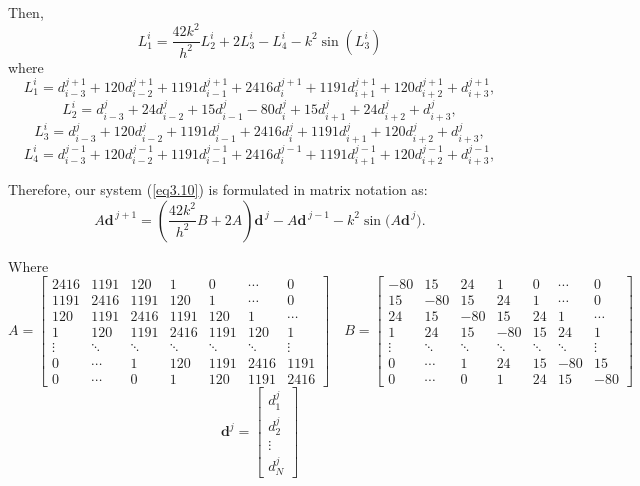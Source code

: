 \documentclass[10pt,letterpaper,twoside]{article}
\begin{document}
\noindent Then,
\begin{equation}\label{eq3.10}
  L_{1}^{i}= \frac{42k^2}{h^2}L_{2}^{i}+2L_{3}^{i}-L_{4}^{i}-k^{2}\sin(L_{3}^{i})
\end{equation}
where 
$$L_{1}^{i}=d_{i-3}^{j+1}+120d_{i-2}^{j+1} + 1191d_{i-1}^{j+1} + 2416d_i^{j+1} + 1191d_{i+1}^{j+1} + 120d_{i+2}^{j+1}+d_{i+3}^{j+1},$$ 
$$L_{2}^{i}= d_{i-3}^{j}+ 24d_{i-2}^{j} + 15d_{i-1}^{j} - 80d_{i}^{j} + 15d_{i+1}^{j} +24 d_{i+2}^{j}+d_{i+3}^{j},$$  
$$L_{3}^{i}=d_{i-3}^{j}+120d_{i-2}^{j} + 1191d_{i-1}^{j} + 2416d_i^{j} + 1191d_{i+1}^{j} + 120d_{i+2}^{j}+d_{i+3}^{j},$$
$$L_{4}^{i}=d_{i-3}^{j-1}+ 120d_{i-2}^{j-1} + 1191d_{i-1}^{j-1}+ 2416d_{i}^{j-1} + 1191d_{i+1}^{j-1} +120 d_{i+2}^{j-1}+d_{i+3}^{j-1},$$

Therefore, our system (\ref{eq3.10}) is formulated in matrix notation as:
\begin{equation}
  A \bm{d}^{\,j+1}
  =
  \left( \frac{42k^2}{h^2} B + 2A \right)\bm{d}^{\,j}
  - A\bm{d}^{\,j-1}
  - k^2 \sin\!\big(A \bm{d}^{\,j}\big).
\end{equation}

Where
\[
 A =
 \begin{bmatrix}
  2416 & 1191 & 120 & 1 & 0 & \cdots & 0\\
  1191 & 2416 & 1191 & 120 & 1 & \cdots & 0\\
  120 & 1191 & 2416 & 1191 & 120 & 1 & \cdots\\
  1 & 120 & 1191 & 2416 & 1191 & 120 & 1\\
  \vdots & \ddots & \ddots & \ddots & \ddots & \ddots & \vdots\\
  0 & \cdots & 1 & 120 & 1191 & 2416 & 1191\\
  0 & \cdots & 0 & 1 & 120 & 1191 & 2416
 \end{bmatrix}
 \quad
 B =
 \begin{bmatrix}
  -80 & 15 & 24 & 1 & 0 & \cdots & 0\\
  15 & -80 & 15 & 24 & 1 & \cdots & 0\\
  24 & 15 & -80 & 15 & 24 & 1 & \cdots\\
  1 & 24 & 15 & -80 & 15 & 24 & 1\\
  \vdots & \ddots & \ddots & \ddots & \ddots & \ddots & \vdots\\
  0 & \cdots & 1 & 24 & 15 & -80 & 15\\
  0 & \cdots & 0 & 1 & 24 & 15 & -80
 \end{bmatrix}
\]
\[
 \bm{d}^{j} =
 \begin{bmatrix}
  d^{j}_1 \\[3pt]
  d^{j}_2 \\[3pt]
  \vdots \\[3pt]
  d^{j}_N
 \end{bmatrix}
\]
\end{document}
